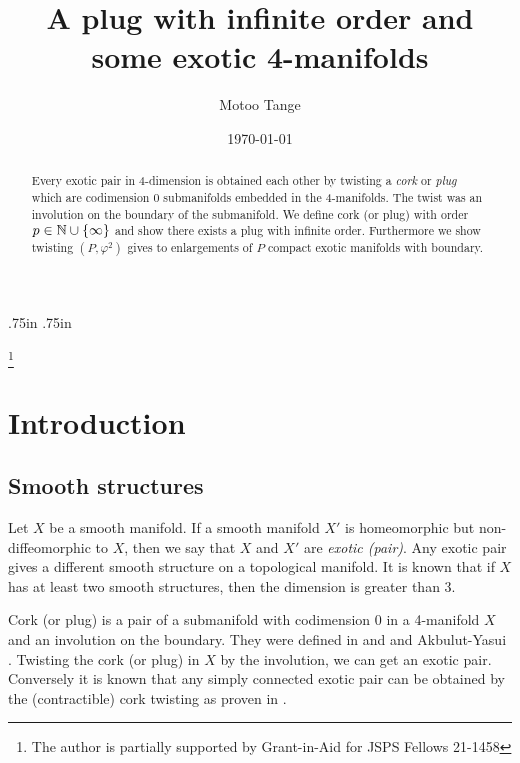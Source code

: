 \documentclass[11pt]{amsart}
\begin{document}
\textwidth 5.5in
\textheight 8.3in
\evensidemargin .75in
\oddsidemargin.75in

\newtheorem{lem}{Lemma}[section]
\newtheorem{conj}{Conjecture}[section]
\newtheorem{defi}{Definition}[section]
\newtheorem{thm}{Theorem}[section]
\newtheorem{cor}{Corollary}[section]
\newtheorem{lis}{List}[section]
\newtheorem{rmk}{Remark}[section]
\newtheorem{que}{Question}[section]
\newtheorem{prop}{Proposition}[section]

\title{A plug with infinite order and some exotic 4-manifolds}
\author{Motoo Tange}
\thanks{The author is partially supported by Grant-in-Aid for JSPS Fellows 21-1458}
\address{Research Institute for Mathematical Sciences, Kyoto University, Kyoto, 606-8502, Japan}
\date{\today}
\maketitle
\begin{abstract}
Every exotic pair in 4-dimension is obtained each other by twisting a {\it cork} or {\it plug} which are codimension $0$ submanifolds embedded in the 4-manifolds.
The twist was an involution on the boundary of the submanifold.
We define cork (or plug) with order $p\in {\Bbb N}\cup \{\infty\}$ and show
there exists a plug with infinite order.
Furthermore we show twisting $(P,\varphi^2)$ gives to enlargements of $P$ compact exotic manifolds with boundary.
\end{abstract}
\section{Introduction}
\subsection{Smooth structures}
Let $X$ be a smooth manifold.
If a smooth manifold $X'$ is homeomorphic but non-diffeomorphic to $X$,
then we say that $X$ and $X'$ are {\it exotic (pair)}.
Any exotic pair gives a different smooth structure on a topological manifold.
It is known that if $X$ has at least two smooth structures, then the dimension is greater than $3$.

Cork (or plug) is a pair of a submanifold with codimension 0 in a 4-manifold $X$ and an involution on the boundary.
They were defined in \cite{[A1]} and \cite{[GS]} and Akbulut-Yasui \cite{[AY1]}.
Twisting the cork (or plug) in $X$ by the involution, we can get an exotic pair.
Conversely it is known that any simply connected exotic pair can be obtained 
by the (contractible) cork twisting as proven in \cite{[AM],[CFHS],[M]}.
\end{document}
